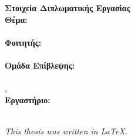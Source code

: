 \pagestyle{empty}
\vspace*{1.5cm}
\begin{center}
    {\Huge \textbf{Στοιχεία Διπλωματικής Εργασίας}}\\[2cm]
    
    \large \textbf{Θέμα:}\\
    \textbf{\Large \doctitle}\\[1.5cm]
    
    \large \textbf{Φοιτητής:}\\
    \Large \textbf{\nomme}\\[1.5cm]
    
    \large \textbf{Ομάδα Επίβλεψης:}\\
    \textbf{\Large \supname}\\
    \large \suptitle, \supuni\\[1.5cm]
    
    \large \textbf{Εργαστήριο:}\\
    \large \lab\\[2cm]
\end{center}

\vfill
\begin{center}
  \small \textit{This thesis was written in LaTeX.}
\end{center}